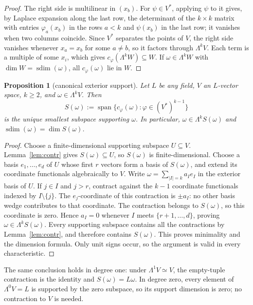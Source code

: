 \documentclass[11pt]{amsart}
\newtheorem{proposition}[theorem]{Proposition}
\theoremstyle{definition}
\theoremstyle{remark}
\numberwithin{equation}{section}
\newcommand{\spn}{\operatorname{span}}
\newcommand{\sdim}{\operatorname{sdim}}
\begin{document}
\begin{proof}
The right side is multilinear in $(x_b)$. For $\psi\in V^*$, applying $\psi$ to it gives, by Laplace expansion along the
last row, the determinant of the $k\times k$ matrix with entries $\varphi_a(x_b)$ in the rows $a<k$ and $\psi(x_b)$ in the last
row; it vanishes when two columns coincide. Since $V^*$ separates the points of $V$, the right side
vanishes whenever $x_a=x_b$ for some $a\ne b$, so it factors through $\Lambda^kV$. Each term is a multiple of some $x_i$, which gives
$c_\varphi(\Lambda^kW)\subseteq W$. If $\omega\in\Lambda^kW$ with $\dim W=\sdim(\omega)$, all $c_\varphi(\omega)$ lie in $W$.
\end{proof}

\begin{proposition}[canonical exterior support]\label{prop:canonical-support}
Let $L$ be any field, $V$ an $L$\nobreakdash-vector space, $k\ge2$, and
$\omega\in\Lambda^kV$. Then
\[
S(\omega):=\spn\{c_\varphi(\omega):\varphi\in(V^*)^{k-1}\}
\]
is the unique smallest subspace supporting $\omega$. In particular,
$\omega\in\Lambda^k S(\omega)$ and
$\sdim(\omega)=\dim S(\omega)$.
\end{proposition}

\begin{proof}
Choose a finite-dimensional supporting subspace $U\subseteq V$.
Lemma~\ref{lem:contr} gives $S(\omega)\subseteq U$, so $S(\omega)$ is
finite-dimensional. Choose a basis $e_1,\dots,e_d$ of $U$ whose first
$r$ vectors form a basis of $S(\omega)$, and extend its coordinate
functionals algebraically to $V$. Write
$\omega=\sum_{|I|=k}a_Ie_I$ in the exterior basis of $U$.
If $j\in I$ and $j>r$, contract against the $k-1$ coordinate functionals
indexed by $I\setminus\{j\}$. The $e_j$\nobreakdash-coordinate of this
contraction is $\pm a_I$: no other basis wedge contributes to that
coordinate. The contraction belongs to $S(\omega)$, so this coordinate
is zero. Hence $a_I=0$ whenever $I$ meets $\{r+1,\dots,d\}$, proving
$\omega\in\Lambda^k S(\omega)$.
Every supporting subspace contains all the contractions by
Lemma~\ref{lem:contr}, and therefore contains $S(\omega)$. This proves
minimality and the dimension formula. Only unit signs occur, so the
argument is valid in every characteristic.
\end{proof}

The same conclusion holds in degree one: under $\Lambda^1V\simeq V$,
the empty-tuple contraction is the identity and $S(\omega)=L\omega$.
In degree zero, every element of $\Lambda^0V=L$ is supported by the
zero subspace, so its support dimension is zero; no contraction to
$V$ is needed.
\end{document}
